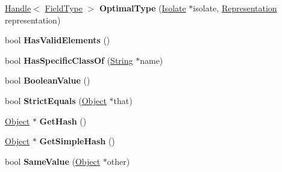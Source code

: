 \begin{DoxyCompactItemize}
\item 
\hyperlink{classv8_1_1internal_1_1_handle}{Handle}$<$ \hyperlink{classv8_1_1internal_1_1_field_type}{Field\+Type} $>$ {\bfseries Optimal\+Type} (\hyperlink{classv8_1_1internal_1_1_isolate}{Isolate} $\ast$isolate, \hyperlink{classv8_1_1internal_1_1_representation}{Representation} representation)\hypertarget{classv8_1_1internal_1_1_object_aaf5c9660b3ae67a56224842066768509}{}\label{classv8_1_1internal_1_1_object_aaf5c9660b3ae67a56224842066768509}

\item 
bool {\bfseries Has\+Valid\+Elements} ()\hypertarget{classv8_1_1internal_1_1_object_a5a4ebd23df8bed6bf2710bc2c8a12958}{}\label{classv8_1_1internal_1_1_object_a5a4ebd23df8bed6bf2710bc2c8a12958}

\item 
bool {\bfseries Has\+Specific\+Class\+Of} (\hyperlink{classv8_1_1internal_1_1_string}{String} $\ast$name)\hypertarget{classv8_1_1internal_1_1_object_aef4836f5ecda222782061a5d0904615d}{}\label{classv8_1_1internal_1_1_object_aef4836f5ecda222782061a5d0904615d}

\item 
bool {\bfseries Boolean\+Value} ()\hypertarget{classv8_1_1internal_1_1_object_aba5c7479210078aba66186661e30d954}{}\label{classv8_1_1internal_1_1_object_aba5c7479210078aba66186661e30d954}

\item 
bool {\bfseries Strict\+Equals} (\hyperlink{classv8_1_1internal_1_1_object}{Object} $\ast$that)\hypertarget{classv8_1_1internal_1_1_object_adc298613478898dacee931f9d2be77d8}{}\label{classv8_1_1internal_1_1_object_adc298613478898dacee931f9d2be77d8}

\item 
\hyperlink{classv8_1_1internal_1_1_object}{Object} $\ast$ {\bfseries Get\+Hash} ()\hypertarget{classv8_1_1internal_1_1_object_a1705a523fa7ddd6974100c014767b718}{}\label{classv8_1_1internal_1_1_object_a1705a523fa7ddd6974100c014767b718}

\item 
\hyperlink{classv8_1_1internal_1_1_object}{Object} $\ast$ {\bfseries Get\+Simple\+Hash} ()\hypertarget{classv8_1_1internal_1_1_object_a7bceb5b8083e8bdb4655b4e8ca0af93b}{}\label{classv8_1_1internal_1_1_object_a7bceb5b8083e8bdb4655b4e8ca0af93b}

\item 
bool {\bfseries Same\+Value} (\hyperlink{classv8_1_1internal_1_1_object}{Object} $\ast$other)\hypertarget{classv8_1_1internal_1_1_object_a4218e7b873b8150ee86e5a5d2572add7}{}\label{classv8_1_1internal_1_1_object_a4218e7b873b8150ee86e5a5d2572add7}


\end{DoxyCompactItemize}
